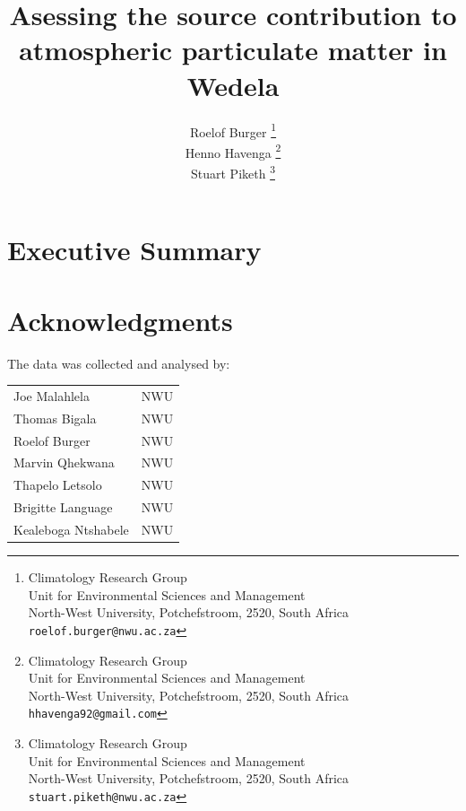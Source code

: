 \documentclass{nwureport}
\begin{document}


     \title{Asessing the source contribution to atmospheric particulate matter in Wedela}
     \author{
        Roelof Burger
          \thanks{
             Climatology Research Group\\
             Unit for Environmental Sciences and Management \\
             North-West University, Potchefstroom, 2520, South Africa \\
             {\tt roelof.burger@nwu.ac.za}} \\
        Henno Havenga
          \thanks{
             Climatology Research Group\\
             Unit for Environmental Sciences and Management \\
             North-West University, Potchefstroom, 2520, South Africa \\
             {\tt hhavenga92@gmail.com}} \\
        Stuart Piketh
          \thanks{
             Climatology Research Group\\
             Unit for Environmental Sciences and Management \\
             North-West University, Potchefstroom, 2520, South Africa \\
             {\tt stuart.piketh@nwu.ac.za}} \\
     }
     \maketitle


\chapter*{Executive Summary}

\pagebreak

\chapter*{Acknowledgments}

The data was collected and analysed by:
\\
\begin{tabular}{ l l } 
Joe Malahlela  & NWU \\
Thomas Bigala  & NWU \\
Roelof Burger  & NWU \\
Marvin Qhekwana & NWU \\
Thapelo Letsolo & NWU \\
Brigitte Language & NWU \\
Kealeboga Ntshabele & NWU \\
\end{tabular}
\end{document}
